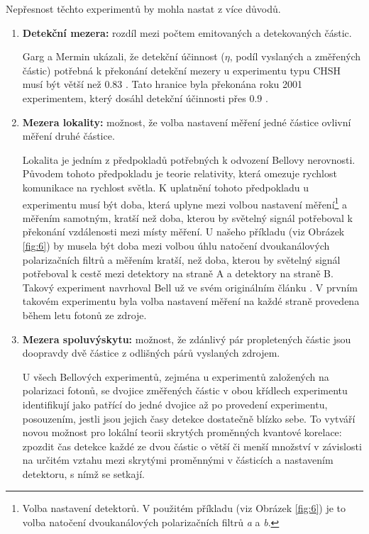 Nepřesnost těchto experimentů by mohla nastat z více důvodů.
\begin{enumerate}
        \item \textbf{Detekční mezera:} rozdíl mezi počtem emitovaných a detekovaných částic. 

        Garg a Mermin ukázali, že detekční účinnost ($\eta$, podíl vyslaných a změřených částic) potřebná k překonání detekční mezery u experimentu typu CHSH musí být větší než $0.83$ \parencite*{det.efficiency}. Tato hranice byla překonána roku 2001 experimentem, který dosáhl detekční účinnosti přes $0.9$ \parencite{belltest:2001}.

        \item \textbf{Mezera lokality:} možnost, že volba nastavení měření jedné částice ovlivní měření druhé částice.

        Lokalita je jedním z předpokladů potřebných k odvození Bellovy nerovnosti. Původem tohoto předpokladu je teorie relativity, která omezuje rychlost komunikace na rychlost světla. K uplatnění tohoto předpokladu u experimentu musí být doba, která uplyne mezi volbou nastavení měření\footnote[4]{Volba nastavení detektorů. V použitém příkladu (viz Obrázek \ref{fig:6}) je to volba natočení dvoukanálových polarizačních filtrů \emph{a} a \emph{b}.} a měřením samotným, kratší než doba, kterou by světelný signál potřeboval k překonání vzdálenosti mezi místy měření. U našeho příkladu (viz Obrázek \ref{fig:6}) by musela být doba mezi volbou úhlu natočení dvoukanálových polarizačních filtrů a měřením kratší, než doba, kterou by světelný signál potřeboval k cestě mezi detektory na straně A a detektory na straně B. Takový experiment navrhoval Bell už ve svém originálním článku \parencite*{bellineq}. V prvním takovém experimentu \parencite{belltest:2} byla volba nastavení měření na každé straně provedena během letu fotonů ze zdroje.

        \item \textbf{Mezera spoluvýskytu:} možnost, že zdánlivý pár propletených částic jsou doopravdy dvě částice z odlišných párů vyslaných zdrojem.
        
        U všech Bellových experimentů, zejména u experimentů založených na polarizaci fotonů, se dvojice změřených částic v obou křídlech experimentu identifikují jako patřící do jedné dvojice až po provedení experimentu, posouzením, jestli jsou jejich časy detekce dostatečně blízko sebe. To vytváří novou možnost pro lokální teorii skrytých proměnných  kvantové korelace: zpozdit čas detekce každé ze dvou částic o větší či menší množství v závislosti na určitém vztahu mezi skrytými proměnnými v částicích a nastavením detektoru, s nímž se setkají.


\end{enumerate}
